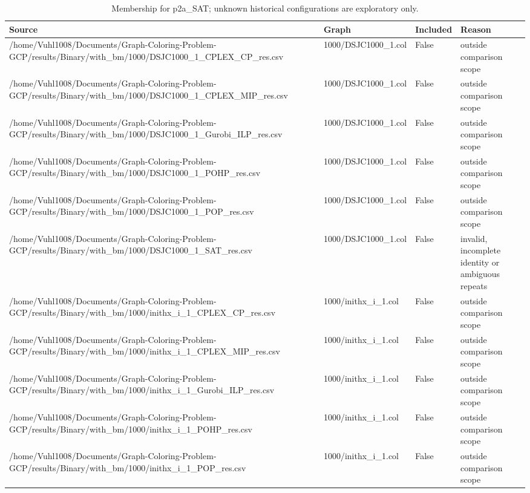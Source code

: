 \begin{table}[htbp]
\centering
\caption{Membership for p2a\_SAT; unknown historical configurations are exploratory only.}
\label{tab:p2a-SAT-membership}
\begin{tabular}{llll}
\hline
Source & Graph & Included & Reason \\
\hline
/home/Vuhl1008/Documents/Graph-Coloring-Problem-GCP/results/Binary/with\_bm/1000/DSJC1000\_1\_CPLEX\_CP\_res.csv & 1000/DSJC1000\_1.col & False & outside comparison scope \\
/home/Vuhl1008/Documents/Graph-Coloring-Problem-GCP/results/Binary/with\_bm/1000/DSJC1000\_1\_CPLEX\_MIP\_res.csv & 1000/DSJC1000\_1.col & False & outside comparison scope \\
/home/Vuhl1008/Documents/Graph-Coloring-Problem-GCP/results/Binary/with\_bm/1000/DSJC1000\_1\_Gurobi\_ILP\_res.csv & 1000/DSJC1000\_1.col & False & outside comparison scope \\
/home/Vuhl1008/Documents/Graph-Coloring-Problem-GCP/results/Binary/with\_bm/1000/DSJC1000\_1\_POHP\_res.csv & 1000/DSJC1000\_1.col & False & outside comparison scope \\
/home/Vuhl1008/Documents/Graph-Coloring-Problem-GCP/results/Binary/with\_bm/1000/DSJC1000\_1\_POP\_res.csv & 1000/DSJC1000\_1.col & False & outside comparison scope \\
/home/Vuhl1008/Documents/Graph-Coloring-Problem-GCP/results/Binary/with\_bm/1000/DSJC1000\_1\_SAT\_res.csv & 1000/DSJC1000\_1.col & False & invalid, incomplete identity or ambiguous repeats \\
/home/Vuhl1008/Documents/Graph-Coloring-Problem-GCP/results/Binary/with\_bm/1000/inithx\_i\_1\_CPLEX\_CP\_res.csv & 1000/inithx\_i\_1.col & False & outside comparison scope \\
/home/Vuhl1008/Documents/Graph-Coloring-Problem-GCP/results/Binary/with\_bm/1000/inithx\_i\_1\_CPLEX\_MIP\_res.csv & 1000/inithx\_i\_1.col & False & outside comparison scope \\
/home/Vuhl1008/Documents/Graph-Coloring-Problem-GCP/results/Binary/with\_bm/1000/inithx\_i\_1\_Gurobi\_ILP\_res.csv & 1000/inithx\_i\_1.col & False & outside comparison scope \\
/home/Vuhl1008/Documents/Graph-Coloring-Problem-GCP/results/Binary/with\_bm/1000/inithx\_i\_1\_POHP\_res.csv & 1000/inithx\_i\_1.col & False & outside comparison scope \\
/home/Vuhl1008/Documents/Graph-Coloring-Problem-GCP/results/Binary/with\_bm/1000/inithx\_i\_1\_POP\_res.csv & 1000/inithx\_i\_1.col & False & outside comparison scope \\

\end{tabular}
\end{table}
